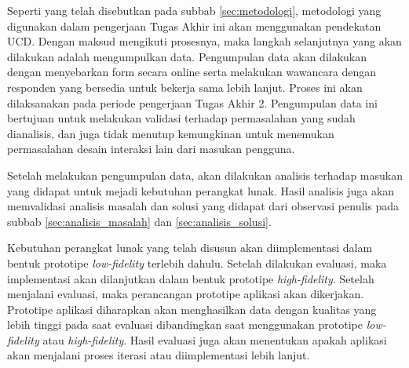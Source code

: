 Seperti yang telah disebutkan pada subbab \ref{sec:metodologi}, metodologi yang digunakan dalam pengerjaan Tugas Akhir ini akan menggunakan pendekatan UCD. Dengan maksud mengikuti prosesnya, maka langkah selanjutnya yang akan dilakukan adalah mengumpulkan data. Pengumpulan data akan dilakukan dengan menyebarkan form secara online serta melakukan wawancara dengan responden yang bersedia untuk bekerja sama lebih lanjut. Proses ini akan dilaksanakan pada periode pengerjaan Tugas Akhir 2. Pengumpulan data ini bertujuan untuk melakukan validasi terhadap permasalahan yang sudah dianalisis, dan juga tidak menutup kemungkinan untuk menemukan permasalahan desain interaksi lain dari masukan pengguna.

Setelah melakukan pengumpulan data, akan dilakukan analisis terhadap masukan yang didapat untuk mejadi kebutuhan perangkat lunak. Hasil analisis juga akan memvalidasi analisis masalah dan solusi yang didapat dari observasi penulis pada subbab \ref{sec:analisis_masalah} dan \ref{sec:analisis_solusi}.

Kebutuhan perangkat lunak yang telah disusun akan diimplementasi dalam bentuk prototipe \textit{low-fidelity} terlebih dahulu. Setelah dilakukan evaluasi, maka implementasi akan dilanjutkan dalam bentuk prototipe \textit{high-fidelity}. Setelah menjalani evaluasi, maka perancangan prototipe aplikasi akan dikerjakan. Prototipe aplikasi diharapkan akan menghasilkan data dengan kualitas yang lebih tinggi pada saat evaluasi dibandingkan saat menggunakan prototipe \textit{low-fidelity} atau \textit{high-fidelity}. Hasil evaluasi juga akan menentukan apakah aplikasi akan menjalani proses iterasi atau diimplementasi lebih lanjut.

